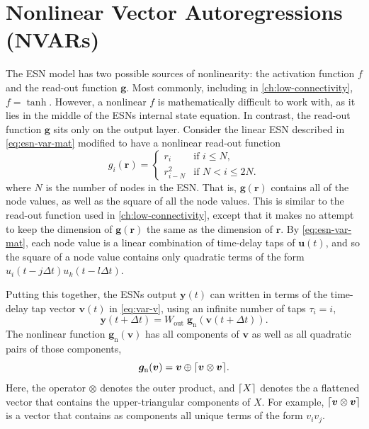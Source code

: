 \section{Nonlinear Vector Autoregressions (NVARs)}\label{sec:nvar}

The ESN model has two possible sources of nonlinearity: the
activation function $f$ and the read-out function $\bm{g}$. Most
commonly, including in \cref{ch:low-connectivity}, $f =
\tanh$. However, a nonlinear $f$ is mathematically difficult to work
with, as it lies in the middle of the ESNs internal state equation. In
contrast, the read-out function $\bm{g}$ sits only on the output
layer. Consider the linear ESN described in
\cref{eq:esn-var-mat} modified to have a nonlinear read-out function
\begin{equation}
  g_i(\bm{r}) = \begin{cases}
    r_i & \text{if } i \leq N, \\
    r_{i - N}^2 & \text{if } N < i \leq 2N.
  \end{cases}
  \label{eq:esn-quadratic-out}
\end{equation}
where $N$ is the number of nodes in the ESN.  That is,
$\bm{g}(\bm{r})$ contains all of the node values, as well as the
square of all the node values. This is similar to the read-out
function used in \cref{ch:low-connectivity}, except that it makes no
attempt to keep the dimension of $\bm{g}(\bm{r})$ the same as the dimension of $\bm{r}$. By
\cref{eq:esn-var-mat}, each node value is a linear combination of
time-delay taps of $\bm{u}(t)$, and so the square of a node value
contains only quadratic terms of the form $u_i(t-j\Delta
t)u_k(t-l\Delta t)$.

Putting this together, the ESNs output $\bm{y}(t)$ can written in
terms of the time-delay tap vector $\bm{v}(t)$ in \cref{eq:var-v},
using an infinite number of taps $\tau_i = i$,
\begin{equation}
  \bm{y}(t + \Delta t) = W_\text{out}\;\bm{g}_\text{n}\left(\bm{v}(t + \Delta t)\right).
\end{equation}
The nonlinear function $\bm{g}_\text{n}(\bm{v})$ has all
components of $\bm{v}$ as well as all quadratic pairs of those components,
\begin{equation}
  \label{eq:quadratic-nvar}
  \bm{g}_\text{n}(\bm{v}) = \bm{v} \oplus \lceil\bm{v} \otimes \bm{v}\rceil.
\end{equation}
Here, the operator $\otimes$ denotes the outer product, and $\lceil X\rceil$
denotes the a flattened vector that contains the upper-triangular
components of $X$. For example, $\lceil\bm{v} \otimes \bm{v}\rceil$ is a
vector that contains as components all unique terms of the form $v_i
v_j$.

